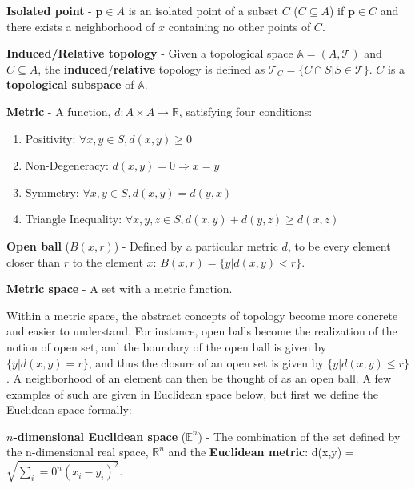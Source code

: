 \begin{defn}
  \textbf{Isolated point} - $\mathbf{p} \in A$ is an isolated point of a
  subset $C$ ($C \subseteq A$) if $\mathbf{p} \in C$ and there exists a
  neighborhood of $x$ containing no other points of $C$.
\end{defn}

\begin{defn}
  \textbf{Induced/Relative topology} - Given a topological space
  $\mathbb{A}=(A,\mathcal{T})$ and $C \subseteq A$,
  the \textbf{induced}/\textbf{relative} topology is defined as
  $\mathcal{T}_C = \{C \cap S | S \in \mathcal{T}\}$. $C$ is a
  \textbf{topological subspace} of $\mathbb{A}$.
\end{defn}

\begin{defn}
  \textbf{Metric} - A function, $d: A \times A \rightarrow \mathbb{R}$,
  satisfying four conditions:
  \begin{enumerate}
  \item Positivity: $\forall x,y \in S, d(x,y) \ge 0$
  \item Non-Degeneracy: $d(x,y)=0 \Rightarrow x=y$
  \item Symmetry: $\forall x,y \in S, d(x,y) = d(y,x)$
  \item Triangle Inequality: $\forall x,y,z \in S, d(x,y) + d(y,z) \ge d(x,z)$
  \end{enumerate}
\end{defn}
\begin{defn}
  \textbf{Open ball} ($B(x,r)$) - Defined by a particular metric $d$, to be
  every element closer than $r$ to the element $x$: $B(x,r) = \{y| d(x,y) < r\}$.
\end{defn}
\begin{defn}
  \textbf{Metric space} - A set with a metric function.
\end{defn}

Within a metric space, the abstract concepts of topology become more concrete and easier to understand.
%
For instance, open balls become the realization of the notion of open set, and the boundary of the open ball is given by $\{y| d(x,y) = r\}$, and thus the closure of an open set is given by $\{y| d(x,y) \leq r\}$.
%
A neighborhood of an element can then be thought of as an open ball.
%
A few examples of such are given in Euclidean space below, but first we define the Euclidean space formally:

\begin{defn}
  \textbf{$n$-dimensional Euclidean space} ($\mathbb{E}^n$) - The combination of
  the set defined by the n-dimensional real space, $\mathbb{R}^n$ and the
  \textbf{Euclidean metric}: d(x,y) = $\sqrt{\sum_i=0^n(x_i-y_i)^2}$.
\end{defn}

